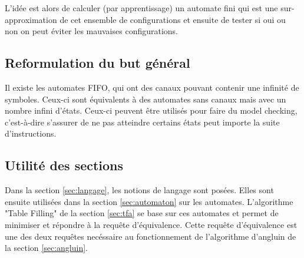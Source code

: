 L’idée est alors de calculer (par apprentissage) un automate fini qui est une sur-approximation de cet ensemble de configurations et ensuite de tester si oui ou non on peut éviter les mauvaises configurations.


\subsection{Reformulation du but général}

Il existe les automates FIFO, qui ont des canaux pouvant contenir une infinité de symboles. Ceux-ci sont équivalents à des automates sans canaux mais avec un nombre infini d'états. Ceux-ci peuvent être utilisés pour faire du model checking, c'est-à-dire s'assurer de ne pas atteindre certains états peut importe la suite d'instructions.

\subsection{Utilité des sections}

Dans la section \ref{sec:langage}, les notions de langage sont posées. Elles sont ensuite utilisées dans la section \ref{sec:automaton} sur les automates. L'algorithme "Table Filling" de la section \ref{sec:tfa} se base sur ces automates et permet de minimiser et répondre à la requête d'équivalence. Cette requête d'équivalence est une des deux requêtes necéssaire au fonctionnement de l'algorithme d'angluin de la section \ref{sec:angluin}.



